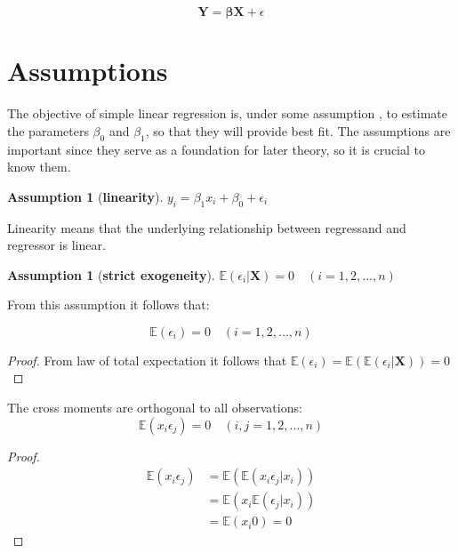 \documentclass[12pt,a4paper,oneside]{book} %
\newtheorem{assumption}[theorem]{Assumption}
\newcommand{\E}{\mathbb{E}}
\begin{document}
\begin{equation}\label{eq:linear regression} 
	\mathbf{Y} = \mathbf{\beta} \mathbf{X} + \epsilon
\end{equation}


\section{Assumptions}
The objective of simple linear regression is, under some assumption \cite[p.4-12]{hayashi2011econometrics}, to estimate the parameters $\beta_0$ and $\beta_1$, so that they will provide best fit. The assumptions are important since they serve as a foundation for later theory, so it is crucial to know them.

\begin{assumption}[\textbf{linearity}]
	$y_i = \beta_1 x_i+\beta_0 +\epsilon_i$
\end{assumption}

Linearity means that the underlying relationship between regressand and regressor is linear. 

\begin{assumption}[\textbf{strict exogeneity}]
	$\E (\epsilon_i | \mathbf{X})=0 \quad (i=1,2,...,n)$ 
\end{assumption}

From this assumption it follows that:

\begin{equation}
\E (\epsilon_i ) =0 \quad (i=1,2,...,n)
\end{equation}

\begin{proof}
	From law of total expectation it follows that $\E (\epsilon_i ) = \E (\E (\epsilon_i | \mathbf{X}))=0$
\end{proof}

The cross moments are orthogonal to all observations:
\begin{equation}
	\E (x_i \epsilon_j)=0  \quad (i,j = 1, 2, ..., n) 
\end{equation}

\begin{proof}
	\begin{align*}
		\E (x_i \epsilon_j) &= \E (\E(x_i \epsilon_j| x_i))\tag*{(by law of total expectation)} \\
		& =\E (x_i\E( \epsilon_j| x_i)) \tag*{(by linearity of expectation)} \\
		&= \E (x_i 0) 	= 0
	\end{align*}
\end{proof}
\end{document}
